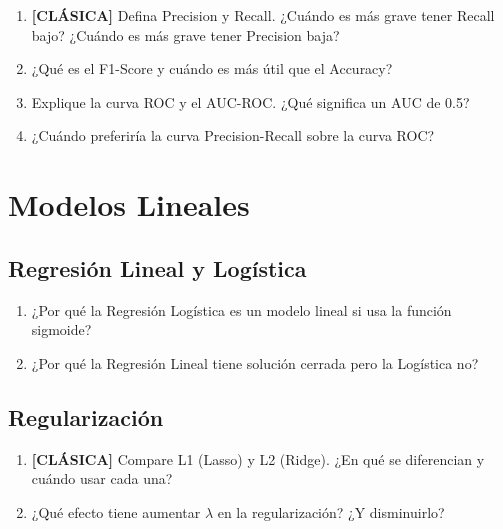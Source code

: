 \documentclass[11pt,a4paper]{article}
\begin{document}
\begin{enumerate}[label=\textbf{P\arabic*.}, resume]

\item \leavevmode

\begin{classicbox}
\textcolor{tdred}{\textbf{[CL\'ASICA]}} Defina Precision y Recall. ¿Cu\'ando es m\'as
grave tener Recall bajo? ¿Cu\'ando es m\'as grave tener Precision baja?
\end{classicbox}

\item ¿Qu\'e es el F1-Score y cu\'ando es m\'as \'util que el Accuracy?

\item Explique la curva ROC y el AUC-ROC. ¿Qu\'e significa un AUC de 0.5?

\item ¿Cu\'ando preferir\'ia la curva Precision-Recall sobre la curva ROC?

\end{enumerate}

\section{Modelos Lineales}

\subsection{Regresi\'on Lineal y Log\'istica}

\begin{enumerate}[label=\textbf{P\arabic*.}, resume]

\item ¿Por qu\'e la Regresi\'on Log\'istica es un modelo lineal si usa la funci\'on sigmoide?

\item ¿Por qu\'e la Regresi\'on Lineal tiene soluci\'on cerrada pero la Log\'istica no?

\end{enumerate}

\subsection{Regularizaci\'on}

\begin{enumerate}[label=\textbf{P\arabic*.}, resume]

\item \leavevmode

\begin{classicbox}
\textcolor{tdred}{\textbf{[CL\'ASICA]}} Compare L1 (Lasso) y L2 (Ridge). ¿En qu\'e
se diferencian y cu\'ando usar cada una?
\end{classicbox}

\item ¿Qu\'e efecto tiene aumentar $\lambda$ en la regularizaci\'on? ¿Y disminuirlo?

\end{enumerate}
\end{document}
